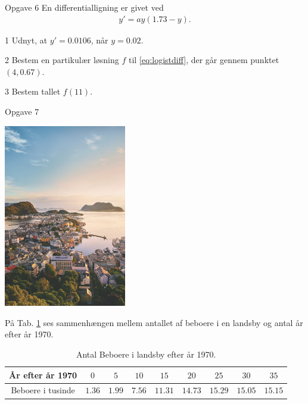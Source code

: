 \begin{opgavetekst}{Opgave 6}
	En differentialligning er givet ved
	\begin{align}\label{eq:logistdiff}
		y' = ay(1.73-y).
	\end{align}
\end{opgavetekst}
\begin{delopgave}{}{1}
	Udnyt, at $y' = 0.0106$, når $y = 0.02$.
\end{delopgave}
\begin{delopgave}{}{2}
	Bestem en partikulær løsning $f$ til \eqref{eq:logistdiff}, der går gennem punktet $(4,0.67)$.
\end{delopgave}
\begin{delopgave}{}{3}
	Bestem tallet $f(11)$.
\end{delopgave}
\newpage
\begin{opgavetekst}{Opgave 7}
	\begin{center}
		\includegraphics[width=0.4\textwidth]{Billeder/by.jpg}
	\end{center}
 	På Tab. \ref{tab:beboere} ses sammenhængen mellem antallet af beboere i en landsby og antal år efter år 1970.
	\begin{table}[H]
	\centering
	\begin{tabular}{c|c|c|c|c|c|c|c|c}
		År efter år 1970 & $0$ & $5$ & $10$ & $15$ & $20$ & $25$ & $30$&$35$\\
		\hline
		Beboere i tusinde & $1.36$ & $1.99$ & $7.56$ & $11.31$ & $14.73$ & $15.29$ & $15.05$ & $15.15$
	\end{tabular}
	\caption{Antal Beboere i landsby efter år 1970.}
	\label{tab:beboere}
	\end{table}
	\phantom{h}
\end{opgavetekst}

